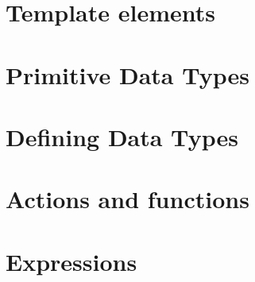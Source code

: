 



\chapter{Template elements}


\chapter{Primitive Data Types}


\chapter{Defining Data Types}



\chapter{Actions and functions}


\chapter{Expressions}


